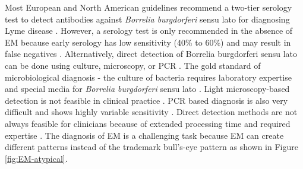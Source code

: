 Most European and North American guidelines recommend a two-tier serology test to detect antibodies against \textit{Borrelia burgdorferi} sensu lato for diagnosing Lyme disease \cite{Eldin2019, Trevisan2020}. However, a serology test is only recommended in the absence of EM because early serology has low sensitivity (40\% to 60\%) and may result in false negatives \cite{Eldin2019}. Alternatively, direct detection of Borrelia burgdorferi sensu lato can be done using culture, microscopy, or PCR \cite{Trevisan2020}. The gold standard of microbiological diagnosis - the culture of bacteria requires laboratory expertise and special media for \textit{Borrelia burgdorferi} sensu lato \cite{Eldin2019}. Light microscopy-based detection is not feasible in clinical practice \cite{Trevisan2020}. PCR based diagnosis is also very difficult and shows highly variable sensitivity \cite{Trevisan2020}. Direct detection methods are not always feasible for clinicians because of extended processing time and required expertise \cite{Burlina2020}. The diagnosis of EM is a challenging task because EM can create different patterns instead of the trademark bull’s-eye pattern as shown in Figure \ref{fig:EM-atypical}.

